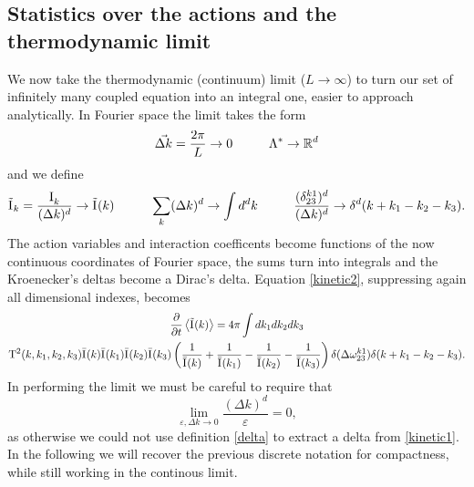 \subsection{Statistics over the actions and the thermodynamic limit}

We now take the thermodynamic (continuum) limit ($L \rightarrow \infty$) to turn our set of infinitely many coupled equation into an integral one, easier to approach analytically.
In Fourier space the limit takes the form 
\begin{equation}
    \vec{\Delta k} = \frac{2\pi}{L} \rightarrow 0 \hspace{10mm} \Lambda^* \rightarrow \mathbb{R}^d
\end{equation}
and we define 
\begin{equation}
    \tilde{\Ia}_k=\frac{\Ia_k}{(\Delta k)^d} \rightarrow \tilde{\Ia}(k) \hspace{10mm} \sum_k (\Delta k)^d \rightarrow \int d^d k \hspace{10mm} 
    \frac{(\delta^{k1}_{23})^d}{(\Delta k)^d} \rightarrow \delta^d(k + k_1 - k_2 - k_3).
\end{equation}
The action variables and interaction coefficents become functions of the now continuous coordinates of Fourier space, the sums turn into integrals and the Kroenecker's deltas become a
Dirac's delta. Equation \eqref{kinetic2}, suppressing again all dimensional indexes, becomes
\begin{multline}
    \frac{\partial}{\partial t} \left\langle \tilde{\mathrm{I}^{}}(k)\right\rangle = 4 \pi\int dk_1 dk_2 dk_3 \\
    \mathrm{T}^2(k, k_1, k_2, k_3)\bar{\mathrm{I}^{}}(k)\bar{\mathrm{I}^{}}(k_1)\bar{\mathrm{I}^{}}(k_2)\bar{\mathrm{I}^{}}(k_3)
    \left(\frac{1}{\bar{\mathrm{I}^{}}(k)} + \frac{1}{\bar{\mathrm{I}^{}}(k_1)} - \frac{1}{\bar{\mathrm{I}^{}}(k_2)}- \frac{1}{\bar{\mathrm{I}^{}}(k_3)}  \right)
    \delta(\Delta{\omega}^{k1}_{23})\delta(k + k_1 - k_2 - k_3).
    \label{kinetic3}
\end{multline}
In performing the limit we must be careful to require that 
\begin{equation}
\underset{\varepsilon, \Delta k \rightarrow 0}{\lim} \frac{(\Delta k)^d}{\varepsilon} = 0 ,
\end{equation}
as otherwise we could not use definition \eqref{delta} to extract a delta from \eqref{kinetic1}. \\
In the following we will recover the previous discrete notation for compactness, while still working in the continous limit.\\

